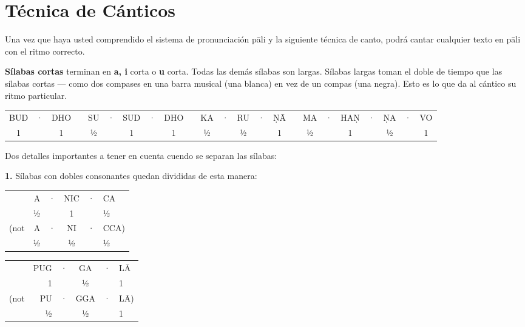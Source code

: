 \section{Técnica de Cánticos}

Una vez que haya usted comprendido el sistema de pronunciación pāli y la siguiente técnica de canto, podrá cantar cualquier texto en pāli con el ritmo correcto.

\textbf{Sílabas cortas} terminan en \textbf{a, i} corta o
\textbf{u} corta. Todas las demás sílabas son largas.
Sílabas largas toman el doble de tiempo que las sílabas cortas --- como dos compases en una barra musical (una blanca) en vez de un compas (una negra). Esto es lo que da al cántico su ritmo particular.

\begin{centering}
	
	{\setlength{\tabcolsep}{1.8pt}%
		\begin{tabular}{ccc c ccccc c ccccc c ccccccc}
			BUD & · & DHO & \hsp & SU & · & SUD & · & DHO & \hsp & KA & · & RU & · & ṆĀ & \hsp & MA & · & HAṆ & · & ṆA & · & VO\\
			1  &   & 1   &      & ½  &   & 1   &   & 1   &      & ½  &   & ½  &   & 1  &      & ½  &   & 1   &   & ½  &   & 1\\
		\end{tabular}%
	}
	
\end{centering}

Dos detalles importantes a tener en cuenta cuendo se separan las sílabas:

\textbf{1.} Sílabas con dobles consonantes quedan divididas de esta manera:

\begin{centering}
	
	\begin{minipage}{0.8\linewidth}
		\begin{multicols}{2}
			\setlength{\tabcolsep}{1.8pt}%
			
			\begin{tabular}{rrcccl}
				& A & · & NIC & · & CA   \\
				& ½ &   &  1  &   & ½    \\
				(not & A & · & NI  & · & CCA) \\
				& ½ &   & ½   &   & ½    \\
			\end{tabular}
			
			\columnbreak
			
			\begin{tabular}{rrcccl}
				& PUG & · & GA  & · & LĀ \\
				&  1  &   &  ½  &   &  1 \\
				(not & PU  & · & GGA & · & LĀ)\\
				&  ½  &   &  ½  &   &  1 \\
			\end{tabular}
			
		\end{multicols}
	\end{minipage}
	
\end{centering}

